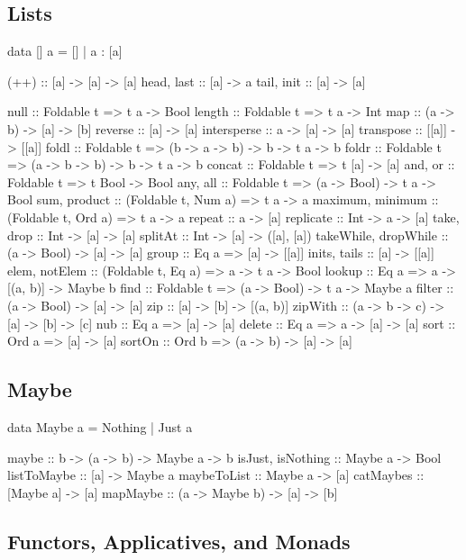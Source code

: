 \documentclass{article}
\begin{document}
\subsection*{Lists}
\begin{hask}
data [] a = [] | a : [a]

(++) :: [a] -> [a] -> [a]
head, last :: [a] -> a
tail, init :: [a] -> [a]

null   :: Foldable t => t a -> Bool
length :: Foldable t => t a -> Int
map :: (a -> b) -> [a] -> [b] 
reverse :: [a] -> [a]
intersperse :: a -> [a] -> [a]
transpose :: [[a]] -> [[a]]
foldl  :: Foldable t => (b -> a -> b) -> b -> t a -> b
foldr  :: Foldable t => (a -> b -> b) -> b -> t a -> b
concat :: Foldable t => t [a] -> [a]
and, or  :: Foldable t => t Bool -> Bool
any, all :: Foldable t => (a -> Bool) -> t a -> Bool
sum, product :: (Foldable t, Num a) => t a -> a
maximum, minimum :: (Foldable t, Ord a) => t a -> a
repeat :: a -> [a]
replicate :: Int -> a -> [a]
take, drop :: Int -> [a] -> [a]
splitAt :: Int -> [a] -> ([a], [a])
takeWhile, dropWhile :: (a -> Bool) -> [a] -> [a]
group :: Eq a => [a] -> [[a]]
inits, tails :: [a] -> [[a]]
elem, notElem :: (Foldable t, Eq a) => a -> t a -> Bool
lookup :: Eq a => a -> [(a, b)] -> Maybe b
find :: Foldable t => (a -> Bool) -> t a -> Maybe a
filter :: (a -> Bool) -> [a] -> [a]
zip :: [a] -> [b] -> [(a, b)]
zipWith :: (a -> b -> c) -> [a] -> [b] -> [c]
nub :: Eq a => [a] -> [a]
delete :: Eq a => a -> [a] -> [a]
sort :: Ord a => [a] -> [a]
sortOn :: Ord b => (a -> b) -> [a] -> [a] 
\end{hask}

\subsection*{Maybe}

\begin{hask}
data Maybe a = Nothing | Just a

maybe :: b -> (a -> b) -> Maybe a -> b
isJust, isNothing :: Maybe a -> Bool
listToMaybe :: [a] -> Maybe a
maybeToList :: Maybe a -> [a]
catMaybes :: [Maybe a] -> [a]
mapMaybe :: (a -> Maybe b) -> [a] -> [b] 
\end{hask}

\pagebreak

\subsection*{Functors, Applicatives, and Monads}
\end{document}
